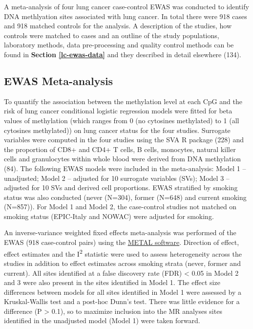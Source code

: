 \documentclass[11pt,oneside]{bristolthesis}
\begin{document}
A meta-analysis of four lung cancer case-control EWAS was conducted to identify DNA methlyation sites associated with lung cancer. In total there were 918 cases and 918 matched controls for the analysis. A description of the studies, how controls were matched to cases and an outline of the study populations, laboratory methods, data pre-processing and quality control methods can be found in \textbf{Section \ref{lc-ewas-data}} and they described in detail elsewhere (134).

\hypertarget{methods-ewas-meta-analysis}{%
\subsection{EWAS Meta-analysis}\label{methods-ewas-meta-analysis}}

To quantify the association between the methylation level at each CpG and the risk of lung cancer conditional logistic regression models were fitted for beta values of methylation (which ranges from 0 (no cytosines methylated) to 1 (all cytosines methylated)) on lung cancer status for the four studies. Surrogate variables were computed in the four studies using the SVA R package (228) and the proportion of CD8+ and CD4+ T cells, B cells, monocytes, natural killer cells and granulocytes within whole blood were derived from DNA methylation (84). The following EWAS models were included in the meta-analysis: Model 1 -- unadjusted; Model 2 -- adjusted for 10 surrogate variables (SVs); Model 3 -- adjusted for 10 SVs and derived cell proportions. EWAS stratified by smoking status was also conducted (never (N=304), former (N=648) and current smoking (N=857)). For Model 1 and Model 2, the case-control studies not matched on smoking status (EPIC-Italy and NOWAC) were adjusted for smoking.

An inverse-variance weighted fixed effects meta-analysis was performed of the EWAS (918 case-control pairs) using the \href{http://csg.sph.umich.edu/abecasis/metal/}{METAL software}. Direction of effect, effect estimates and the I\textsuperscript{2} statistic were used to assess heterogeneity across the studies in addition to effect estimates across smoking strata (never, former and current). All sites identified at a false discovery rate (FDR) \textless{} 0.05 in Model 2 and 3 were also present in the sites identified in Model 1. The effect size differences between models for all sites identified in Model 1 were assessed by a Kruskal-Wallis test and a post-hoc Dunn's test. There was little evidence for a difference (P \textgreater{} 0.1), so to maximize inclusion into the MR analyses sites identified in the unadjusted model (Model 1) were taken forward.
\end{document}
